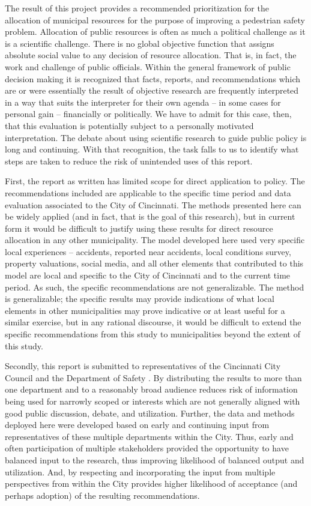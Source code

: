 \documentclass{llncs}
\begin{document}
The result of this project provides a recommended prioritization for the allocation of municipal resources for the purpose of improving a pedestrian safety problem. Allocation of  public resources is often as much a political challenge as it is a scientific challenge. There is no global objective function that assigns absolute social value to any decision of resource allocation. That is, in fact, the work and challenge of public officials. Within the general framework of public decision making it is recognized that facts, reports, and recommendations which are or were essentially the result of objective research are frequently interpreted in a way that suits the interpreter for their own agenda – in some cases for personal gain – financially or politically. We have to admit for this case, then, that this evaluation is potentially subject to a personally motivated interpretation. The debate about using scientific research to guide public policy is long and continuing. With that recognition, the task falls to us to identify what steps are taken to reduce the risk of unintended uses of this report.

First, the report as written has limited scope for direct application to policy. The recommendations included are applicable to the specific time period and data evaluation associated to the City of Cincinnati. The methods presented here can be widely applied (and in fact, that is the goal of this research), but in current form it would be difficult to justify using these results for direct resource allocation in any other municipality. The model developed here used very specific local experiences – accidents, reported near accidents, local conditions survey, property valuations, social media, and all other elements that contributed to this model are local and specific to the City of Cincinnati and to the current time period. As such, the specific recommendations are not generalizable. The method is generalizable; the specific results may provide indications of what local elements in other municipalities may prove indicative or at least useful for a similar exercise, but in any rational discourse, it would be difficult to extend the specific recommendations from this study to municipalities beyond the extent of this study.

Secondly, this report is submitted to representatives of the Cincinnati City Council and the Department of Safety . By distributing the results to more than one department and to a reasonably broad audience reduces risk of information being used for narrowly scoped  or interests which are not generally aligned with good public discussion, debate, and utilization. Further, the data and methods deployed here were developed based on early and continuing input from representatives of these multiple departments within the City. Thus, early and often participation of multiple stakeholders provided the opportunity to have balanced input to the research, thus improving likelihood of balanced output and utilization. And, by respecting and incorporating the input from multiple perspectives from within the City provides higher likelihood of acceptance (and perhaps adoption) of the resulting recommendations.
\end{document}
